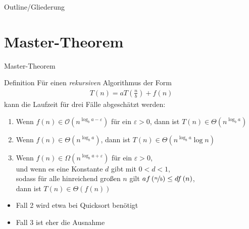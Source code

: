 
\subtitle{Foliensatz 10}
\date{10. Januar 2013}



\begin{frame}
    \titlepage
\end{frame}

\begin{frame}{Outline/Gliederung}
    \tableofcontents
\end{frame}

\section{Master-Theorem}
\begin{frame}{Master-Theorem}
    \begin{block}{Definition}
        Für einen \emph{rekursiven} Algorithmus der Form
        \begin{align*}
            T\left( n \right) = aT\left( \frac{n}{b} \right) + f\left( n \right)
        \end{align*}
        kann die Laufzeit für drei Fälle abgeschätzt werden:
        \pause
        \begin{enumerate}
            \item Wenn $f\left( n \right)\in \mathcal{O}\left( n^{\log_b a-\varepsilon} \right)$ für ein $\varepsilon > 0$, 
                dann ist $T\left( n \right) \in \Theta\left( n^{\log_b a} \right)$
                \pause
            \item Wenn $f\left( n \right)\in \Theta\left( n^{\log_b a} \right)$, 
                dann ist $T\left( n \right) \in \Theta\left( n^{\log_b a} \log n\right)$
                \pause
            \item Wenn $f\left( n \right)\in \Omega\left( n^{\log_b a+\varepsilon} \right)$ für ein $\varepsilon > 0$, \\ 
                und wenn es eine Konstante $d$ gibt mit $0<d<1$,\\ 
                sodass für alle hinreichend großen $n$ gilt $af\left( \nicefrac{n}{b} \right) \leq df\left( n \right)$,\\ 
                dann ist $T\left( n \right) \in \Theta\left( f\left( n \right) \right)$
        \end{enumerate}
    \end{block}
    \begin{itemize}
        \item Fall 2 wird etwa bei Quicksort benötigt
        \item Fall 3 ist eher die Ausnahme
    \end{itemize}
\end{frame}

